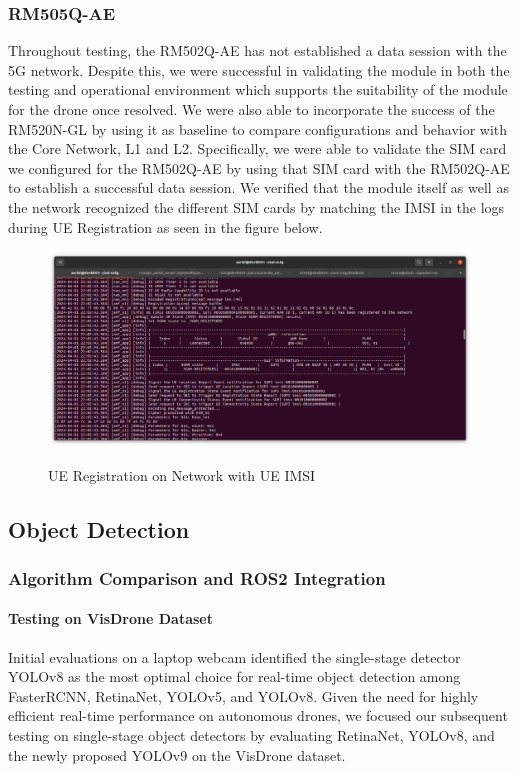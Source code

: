 \documentclass[conference]{IEEEtran}
\begin{document}
\subsubsection{RM505Q-AE}
Throughout testing, the RM502Q-AE has not established a data session with the 5G network. Despite this, we were successful in validating the module in both the testing and operational environment which supports the suitability of the module for the drone once resolved. We were also able to incorporate the success of the RM520N-GL by using it as baseline to compare configurations and behavior with the Core Network, L1 and L2. Specifically, we were able to validate the SIM card we configured for the RM502Q-AE by using that SIM card with the RM502Q-AE to establish a successful data session. We verified that the module itself as well as the network recognized the different SIM cards by matching the IMSI in the logs during UE Registration as seen in the figure below. 
\begin{figure}[htbp]
    \centering
    \resizebox{9cm}{5cm}
    {\includegraphics{figures/registeredIMSI.png}}
    \caption{UE Registration on Network with UE IMSI}
    \label{IMSI Registered}
\end{figure}

\subsection{Object Detection}
\subsubsection{Algorithm Comparison and ROS2 Integration}
\paragraph{Testing on VisDrone Dataset}
Initial evaluations on a laptop webcam identified the single-stage detector YOLOv8 as the most optimal choice for real-time object detection among FasterRCNN, RetinaNet, YOLOv5, and YOLOv8. Given the need for highly efficient real-time performance on autonomous drones, we focused our subsequent testing on single-stage object detectors by evaluating RetinaNet, YOLOv8, and the newly proposed YOLOv9 on the VisDrone dataset. 
\end{document}
